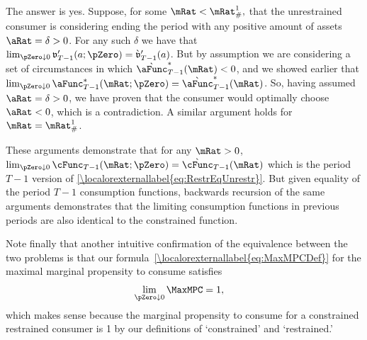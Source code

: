 \documentclass[\econtexRoot/BufferStockTheory]{subfiles}
\begin{document}
The answer is yes.  Suppose, for some $\mRat < \mRat^{1}_{\#},$ that the
unrestrained consumer is considering ending the period with any
positive amount of assets $\aRat=\delta > 0$.  For any such $\delta$ we
have that $\lim_{\pZero  \downarrow 0} \mathfrak{v}_{T-1}^{\prime}(a;\pZero)=\grave{\mathfrak{v}}_{T-1}^{\prime}(a)$.
But by assumption we are considering a set of circumstances in which
$\grave{\aFunc}_{T-1}^{*}(\mRat) < 0$, and we showed earlier that
$\lim_{\pZero  \downarrow 0} \aFunc_{T-1}^{*}(\mRat;\pZero) = \grave{\aFunc}_{T-1}^{*}(\mRat)$.  So,
having assumed $\aRat = \delta > 0$, we have proven that the consumer
would optimally choose $\aRat < 0$, which is a contradiction.  A similar
argument holds for $\mRat = \mRat^{1}_{\#}$.

These arguments demonstrate that for any $\mRat>0$, $\lim_{\pZero
  \downarrow 0} \cFunc_{T-1}(\mRat;\pZero) =
\grave{\cFunc}_{T-1}(\mRat)$ which is the period $T-1$ version of
\eqref{\localorexternallabel{eq:RestrEqUnrestr}}.  But given equality of the period $T-1$
consumption functions, backwards recursion of the same arguments
demonstrates that the limiting consumption functions in previous
periods are also identical to the constrained function.

Note finally that another intuitive confirmation of the equivalence
between the two problems is that our formula~\eqref{\localorexternallabel{eq:MaxMPCDef}} for the maximal marginal
propensity to consume satisfies
\begin{eqnarray*}
  \lim_{\pZero \downarrow 0} \MaxMPC  & = 1,
\end{eqnarray*}
which makes sense because the marginal propensity to consume for a
constrained restrained consumer is 1 by our definitions of
`constrained' and `restrained.'

\onlyinsubfile{}
\end{document}
